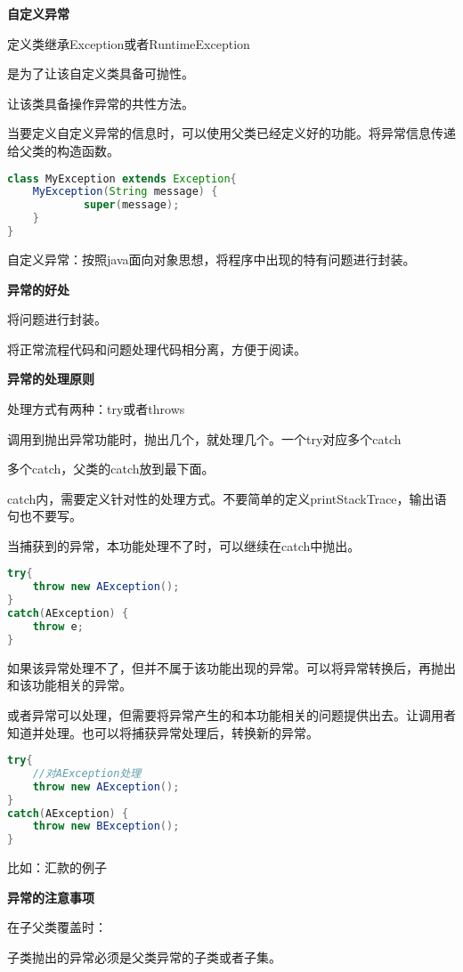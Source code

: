 \documentclass[UTF8]{ctexart}
\begin{document}
\textbf{自定义异常}

定义类继承Exception或者RuntimeException

\textbullet 是为了让该自定义类具备可抛性。

\textbullet 让该类具备操作异常的共性方法。

当要定义自定义异常的信息时，可以使用父类已经定义好的功能。将异常信息传递给父类的构造函数。
\begin{lstlisting}[language = Java]
class MyException extends Exception{
	MyException(String message) { 
			super(message);
	}
}
\end{lstlisting}

自定义异常：按照java面向对象思想，将程序中出现的特有问题进行封装。

\textbf{异常的好处}

\textbullet 将问题进行封装。

\textbullet 将正常流程代码和问题处理代码相分离，方便于阅读。

\textbf{异常的处理原则}

\textbullet 处理方式有两种：try或者throws

\textbullet 调用到抛出异常功能时，抛出几个，就处理几个。一个try对应多个catch

\textbullet 多个catch，父类的catch放到最下面。

\textbullet catch内，需要定义针对性的处理方式。不要简单的定义printStackTrace，输出语句也不要写。

当捕获到的异常，本功能处理不了时，可以继续在catch中抛出。

\begin{lstlisting}[language = Java]
try{
	throw new AException();
}
catch(AException) {
	throw e;
}
\end{lstlisting}

如果该异常处理不了，但并不属于该功能出现的异常。可以将异常转换后，再抛出和该功能相关的异常。

或者异常可以处理，但需要将异常产生的和本功能相关的问题提供出去。让调用者知道并处理。也可以将捕获异常处理后，转换新的异常。
\begin{lstlisting}[language = Java]
try{
	//对AException处理
	throw new AException();
}
catch(AException) {
	throw new BException();
}
\end{lstlisting}
比如：汇款的例子

\textbf{异常的注意事项}

在子父类覆盖时：

\textbullet 子类抛出的异常必须是父类异常的子类或者子集。
\end{document}

